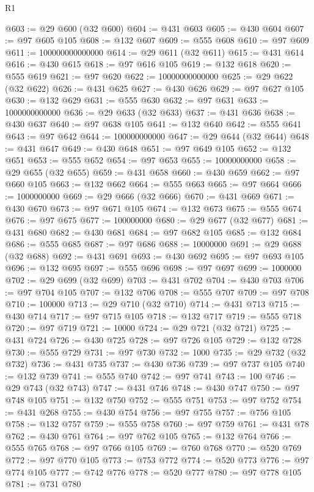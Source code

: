 \begin{lexlean}{R1}
\begin{coremodule}
@603 := @29 @600 (@32 @600)
@604 := @431 @603
@605 := @430 @604
@607 := @97 @605 @105
@608 := @132 @607
@609 := @555 @608
@610 := @97 @609
@611 := 100000000000000
@614 := @29 @611 (@32 @611)
@615 := @431 @614
@616 := @430 @615
@618 := @97 @616 @105
@619 := @132 @618
@620 := @555 @619
@621 := @97 @620
@622 := 10000000000000
@625 := @29 @622 (@32 @622)
@626 := @431 @625
@627 := @430 @626
@629 := @97 @627 @105
@630 := @132 @629
@631 := @555 @630
@632 := @97 @631
@633 := 1000000000000
@636 := @29 @633 (@32 @633)
@637 := @431 @636
@638 := @430 @637
@640 := @97 @638 @105
@641 := @132 @640
@642 := @555 @641
@643 := @97 @642
@644 := 100000000000
@647 := @29 @644 (@32 @644)
@648 := @431 @647
@649 := @430 @648
@651 := @97 @649 @105
@652 := @132 @651
@653 := @555 @652
@654 := @97 @653
@655 := 10000000000
@658 := @29 @655 (@32 @655)
@659 := @431 @658
@660 := @430 @659
@662 := @97 @660 @105
@663 := @132 @662
@664 := @555 @663
@665 := @97 @664
@666 := 1000000000
@669 := @29 @666 (@32 @666)
@670 := @431 @669
@671 := @430 @670
@673 := @97 @671 @105
@674 := @132 @673
@675 := @555 @674
@676 := @97 @675
@677 := 100000000
@680 := @29 @677 (@32 @677)
@681 := @431 @680
@682 := @430 @681
@684 := @97 @682 @105
@685 := @132 @684
@686 := @555 @685
@687 := @97 @686
@688 := 10000000
@691 := @29 @688 (@32 @688)
@692 := @431 @691
@693 := @430 @692
@695 := @97 @693 @105
@696 := @132 @695
@697 := @555 @696
@698 := @97 @697
@699 := 1000000
@702 := @29 @699 (@32 @699)
@703 := @431 @702
@704 := @430 @703
@706 := @97 @704 @105
@707 := @132 @706
@708 := @555 @707
@709 := @97 @708
@710 := 100000
@713 := @29 @710 (@32 @710)
@714 := @431 @713
@715 := @430 @714
@717 := @97 @715 @105
@718 := @132 @717
@719 := @555 @718
@720 := @97 @719
@721 := 10000
@724 := @29 @721 (@32 @721)
@725 := @431 @724
@726 := @430 @725
@728 := @97 @726 @105
@729 := @132 @728
@730 := @555 @729
@731 := @97 @730
@732 := 1000
@735 := @29 @732 (@32 @732)
@736 := @431 @735
@737 := @430 @736
@739 := @97 @737 @105
@740 := @132 @739
@741 := @555 @740
@742 := @97 @741
@743 := 100
@746 := @29 @743 (@32 @743)
@747 := @431 @746
@748 := @430 @747
@750 := @97 @748 @105
@751 := @132 @750
@752 := @555 @751
@753 := @97 @752
@754 := @431 @268
@755 := @430 @754
@756 := @97 @755
@757 := @756 @105
@758 := @132 @757
@759 := @555 @758
@760 := @97 @759
@761 := @431 @78
@762 := @430 @761
@764 := @97 @762 @105
@765 := @132 @764
@766 := @555 @765
@768 := @97 @766 @105
@769 := @760 @768
@770 := @520 @769
@772 := @97 @770 @105
@773 := @753 @772
@774 := @520 @773
@776 := @97 @774 @105
@777 := @742 @776
@778 := @520 @777
@780 := @97 @778 @105
@781 := @731 @780

\end{coremodule}
\end{lexlean}
